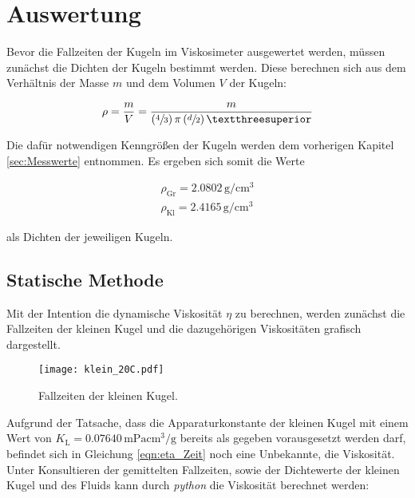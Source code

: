 %

%
\section{Auswertung}
\label{sec:Auswertung}

Bevor die Fallzeiten der Kugeln im Viskosimeter ausgewertet werden, müssen zunächst die Dichten der Kugeln 
bestimmt werden. Diese berechnen sich aus dem Verhältnis der Masse $m$ und dem Volumen $V$ der Kugeln:

\begin{equation*}
    \rho = \frac{m}{V} = \frac{m}{\left(\sfrac{4}{3}\right)\pi\left(\sfrac{d}{2}\right)³}
\end{equation*}

\noindent Die dafür notwendigen Kenngrößen der Kugeln werden dem vorherigen Kapitel \ref{sec:Messwerte} entnommen. Es 
ergeben sich somit die Werte

\begin{gather*}
    \rho_\text{Gr} = 2.0802\,\unit{\gram\per\centi\cubic\meter} \\
    \rho_\text{Kl} = 2.4165\,\unit{\gram\per\centi\cubic\meter}
\end{gather*}

\noindent als Dichten der jeweiligen Kugeln.

\subsection{Statische Methode}

Mit der Intention die dynamische Viskosität $\eta$ zu berechnen, werden zunächst die Fallzeiten der kleinen Kugel 
und die dazugehörigen Viskositäten grafisch dargestellt.

\begin{figure}[H]
    \centering
    \texttt{[image: klein\_20C.pdf]}
    \caption{Fallzeiten der kleinen Kugel.}
\end{figure}

\noindent Aufgrund der Tatsache, dass die Apparaturkonstante der kleinen Kugel mit einem Wert von
$K_\text{L} = 0.07640\,\unit{\milli\pascal\centi\cubic\meter\per\gram}$ bereits als gegeben vorausgesetzt werden darf, 
befindet sich in Gleichung \eqref{eqn:eta_Zeit} noch eine Unbekannte, die Viskosität. Unter Konsultieren der
gemittelten Fallzeiten, sowie der Dichtewerte der kleinen Kugel und des Fluids kann durch \emph{python} die Viskosität 
berechnet werden:

